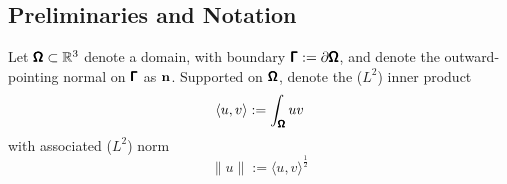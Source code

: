 \subsection*{Preliminaries and Notation}

    Let $\pmb{\mathsf{\Omega}}  \subset  \mathbb{R}^{3}$ denote a  domain, with boundary $\pmb{\mathsf{\Gamma}}  :=  \partial\pmb{\mathsf{\Omega}}$, and denote the outward-pointing normal on $\pmb{\mathsf{\Gamma}}$ as $\mathbf{n}$. Supported on $\pmb{\mathsf{\Omega}}$, denote the ($L^{2}$) inner product
    \begin{equation}
        \langle u, v\rangle  :=  \int_{\pmb{\mathsf{\Omega}}}uv
    \end{equation}
    with associated ($L^{2}$) norm
    \begin{equation}
        \|u\|  :=  \langle u, v\rangle^{\frac{1}{2}}
    \end{equation}
    
